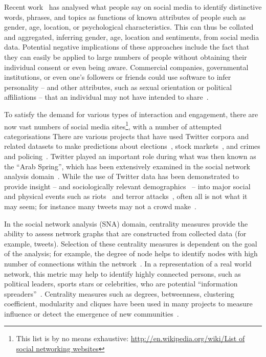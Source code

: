\documentclass[conference]{IEEEtran}
\begin{document}
Recent
work~\cite{blamey-et-al-2012,schwartz-et-al:2013,blamey-et-al-2013,oatley+crick:2014,oatley-et-al-soccogcomp2015}
has analysed what people say on social media to identify distinctive
words, phrases, and topics as functions of known attributes of people
such as gender, age, location, or psychological characteristics. This
can thus be collated and aggregated, inferring gender, age, location
and sentiments, from social media data. Potential negative
implications of these approaches include the fact that they can easily
be applied to large numbers of people without obtaining their
individual consent or even being aware. Commercial companies,
governmental institutions, or even one's followers or friends could
use software to infer personality -- and other attributes, such as
sexual orientation or political affiliations -- that an individual may
not have intended to share~\cite{lambiotte+kosinski:2014,postsm:2014}.

To satisfy the demand for various types of interaction and engagement,
there are now vast numbers of social media sites\footnote{This list is
by no means exhaustive: \url{http://en.wikipedia.org/wiki/List of
social networking websites}}, with a number of attempted
categorisations There are various projects that have used Twitter
corpora and related datasets to make predictions about
elections~\cite{tumasjan-et-al:2010}, stock
markets~\cite{zhang-et-al:2011}, and crimes and
policing~\cite{gerber:2014,oatley+crick_fosintsi2014,oatley+crick:2015}. Twitter
played an important role during what was then known as the ``Arab
Spring'', which has been extensively examined in the social network
analysis
domain~\cite{lotan-et-al:2011,howard-et-al:2011,comunello+anzera:2012,wolfsfeld-et-al:2013,bruns-et-al:2013}.
While the use of Twitter data has been demonstrated to provide insight
-- and sociologically relevant demographics~\cite{sloan-et-al:2013} --
into major social and physical events such as
riots~\cite{procter-et-al:2013} and terror
attacks~\cite{burnap-et-al:2014}, often all is not what it may seem;
for instance many tweets may not a crowd make~\cite{liang-et-al:2013}.

In the social network analysis (SNA) domain, centrality measures
provide the ability to assess network graphs that are constructed from
collected data (for example, tweets). Selection of these centrality
measures is dependent on the goal of the analysis; for example, the
degree of node helps to identify nodes with high number of connections
within the
network~\cite{borgatti+everett:2000,rombach-et-al:2014,liu-et-al:2014}.
In a representation of a real world network, this metric may help to
identify highly connected persons, such as political leaders, sports
stars or celebrities, who are potential ``information
spreaders''~\cite{cha-et-al:2012,borge-holthoefer-et-al:2012,zhang-et-al:2016}.
Centrality measures such as degrees, betweenness, clustering
coefficient, modularity and cliques have been used in many projects to
measure influence or detect the emergence of new
communities~\cite{willis-et-al:2015,oatley+crick:2015}.
\end{document}
